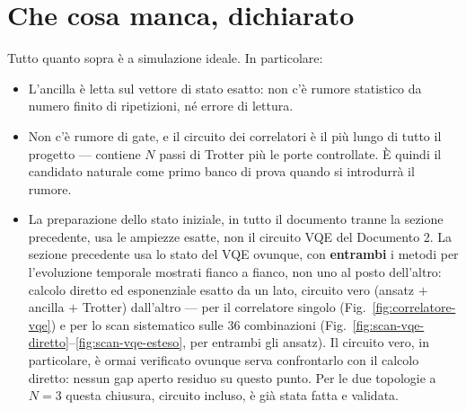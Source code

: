 \documentclass[11pt,a4paper]{article}
\begin{document}

\section{Che cosa manca, dichiarato}

Tutto quanto sopra è a simulazione ideale. In particolare:

\begin{itemize}[leftmargin=1.5em,itemsep=2pt]
\item L'ancilla è letta sul vettore di stato esatto: non c'è rumore statistico
da numero finito di ripetizioni, né errore di lettura.
\item Non c'è rumore di gate, e il circuito dei correlatori è il più lungo di
tutto il progetto --- contiene $N$ passi di Trotter più le porte controllate.
È quindi il candidato naturale come primo banco di prova quando si introdurrà
il rumore.
\item La preparazione dello stato iniziale, in tutto il documento tranne la
sezione precedente, usa le ampiezze esatte, non il circuito VQE del
Documento 2. La sezione precedente usa lo stato del VQE ovunque, con
\textbf{entrambi} i metodi per l'evoluzione temporale mostrati fianco a
fianco, non uno al posto dell'altro: calcolo diretto ed esponenziale
esatto da un lato, circuito vero (ansatz $+$ ancilla $+$ Trotter)
dall'altro --- per il correlatore singolo
(Fig.~\ref{fig:correlatore-vqe}) e per lo scan sistematico sulle $36$
combinazioni (Fig.~\ref{fig:scan-vqe-diretto}--\ref{fig:scan-vqe-esteso},
per entrambi gli ansatz). Il circuito vero, in particolare, è ormai
verificato ovunque serva confrontarlo con il calcolo diretto: nessun gap
aperto residuo su questo punto. Per le
due topologie a $N=3$ questa chiusura, circuito incluso, è già stata fatta
e validata.
\end{itemize}
\end{document}
